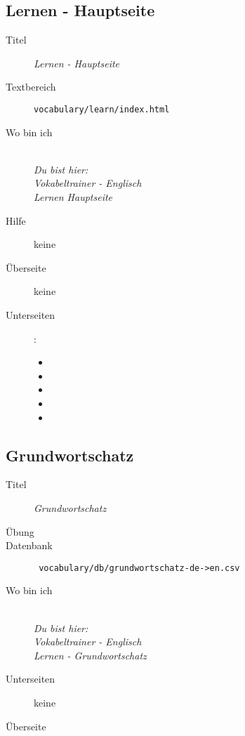 \subsection{ Lernen - Hauptseite }
\label{has:voc-learn-page0}
\begin{description}
	\item[Titel] \emph{ Lernen - Hauptseite }
	\item[Textbereich] \texttt{vocabulary/learn/index.html}
	\item[Wo bin ich] \emph{\\Du bist hier:\\Vokabeltrainer - Englisch\\Lernen Hauptseite}
	\item[Hilfe] keine
	\item[Überseite] keine
	\item[Unterseiten] :
	\begin{itemize}
		\item {}
		\item {}
		\item {}
		\item {}
		\item {}
	\end{itemize}
\end{description}


\subsection{ Grundwortschatz }
\label{has:voc-learn-page1}
\begin{description}
	\item[Titel] \emph{ Grundwortschatz }
	\item[Übung] 
	\item[Datenbank] \texttt{ vocabulary/db/grundwortschatz-de->en.csv }
	\item[Wo bin ich] \emph{\\Du bist hier:\\Vokabeltrainer - Englisch\\Lernen - Grundwortschatz}
	\item[Unterseiten] keine
	\item[Überseite] 
\end{description}

